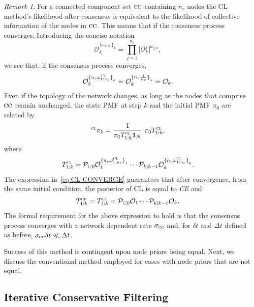 \documentclass[journal]{IEEEtran}
\theoremstyle{remark}
\newtheorem{remark}{Remark}
\newcommand{\suf}[1]{\textsc{\tiny #1}}  %
\theoremstyle{definition}
\begin{document}
\begin{remark}
For a connected component set $\textsc{cc}$ containing $n_{c}$ nodes
the CL method's likelihood after consensus is equivalent to the likelihood of collective information of the nodes in $\textsc{cc}$. This means that if the consensus process converges,
Introducing the concise notation 
\begin{equation}
\mathcal{O}_{k}^{{\{\omega_{1:n_{c}}\}}_{k}} = \prod_{j = 1}^{n_{c}}  \big[\mathcal{O}_k^j]^{\omega_{j,k}},
\end{equation} 
we see that, if the consensus process converges,
\begin{equation}
\mathcal{O}_{k}^{{\{n_c\omega_{1:n_{c}}^{\suf{CL}}\}}_{k}}= \mathcal{O}_{k}^{{\{n_c\frac{1}{n_c}\}}_{k}} = \mathcal{O}_{k}.
\label{eq:CL-CONVERGE} 
\end{equation}
Even if the topology of the network changes, as long as the nodes that comprise $\textsc{cc}$ remain unchanged, the state PMF at step $k$ and the initial PMF $\pi_{0}$ are related by
\begin{equation}
{}^{\suf{CL}}{\pi}_{k} = \frac{1}{{\pi}_{0}T_{1:k}^{\suf{CL}}\mathbf{1}_N}\,\,{\pi_{0}}T_{1:k}^{\suf{CL}} 
,\label{CL-UPDATE} 
\end{equation}
where  
\begin{equation}
\label{CL-INC}
{T}_{1:k}^{\suf{CL}}  =\mathcal{P}_{1\vert0}\mathcal{O}_{1}^{{\{n_c\omega_{1:n_{c}}^{\suf{CL}}\}}_{1}}\cdots\mathcal{P}_{k\vert k-1}\mathcal{O}_{k}^{{\{n_c\omega_{1:n_{c}}^{\suf{CL}}\}}_{k}}. 
\end{equation}
The expression in~\eqref{eq:CL-CONVERGE} guarantees that after convergence,
from the same initial condition, the posterior of CL is equal to
\emph{CE} and 
\begin{equation} \label{TCL}
{T}_{1:k}^{\suf{CE}} = {T}_{1:k}^{\suf{CL}}  =\mathcal{P}_{1\vert0}\mathcal{O}_{1}\cdots\mathcal{P}_{k\vert k-1}\mathcal{O}_{k}.
\end{equation}
The formal requirement for the above expression to hold is that the consensus
process converges with a network dependent rate $\sigma_{\textsc{cc}}$ and, for
$\delta t$ and $\Delta t$ defined as before, $\sigma_{\textsc{cc}}\delta t \ll
\Delta t$.
\end{remark}

Success of this method is contingent upon node priors being equal. Next,
we discuss the conventional method employed for cases with
node priors that are not equal.

\subsection{Iterative Conservative Filtering} 
\end{document}
